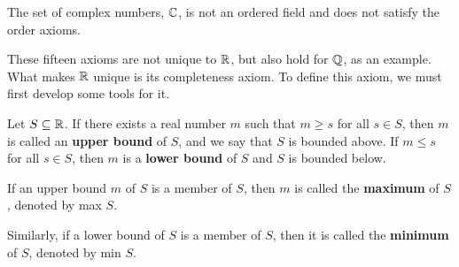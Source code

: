 \begin{note}
	The set of complex numbers, $\mathbb{C}$, is not an ordered field and does not satisfy the order axioms.
\end{note}

These fifteen axioms are not unique to $\mathbb{R}$, but also hold for $\mathbb{Q}$, as an example. What makes $\mathbb{R}$ unique is its completeness axiom. To define this axiom, we must first develop some tools for it.

\begin{definition}
	Let $S\subseteq\mathbb{R}$. If there exists a real number $m$ such that $m\geq s$ for all $s\in S$, then $m$ is called an \textbf{upper bound} of $S$, and we say that $S$ is bounded above. If $m\leq s$ for all $s\in S$, then $m$ is a \textbf{lower bound} of $S$ and $S$ is bounded below.
	
	If an upper bound $m$ of $S$ is a member of $S$, then $m$ is called the \textbf{maximum} of $S$, denoted by max $S$.
	
	Similarly, if a lower bound of $S$ is a member of $S$, then it is called the \textbf{minimum} of $S$, denoted by min $S$.
\end{definition}

